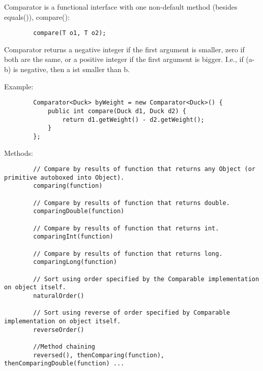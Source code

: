 \documentclass{scrartcl}
\begin{document}
    Comparator is a functional interface with one non-default method (besides equals()), compare():

    \begin{lstlisting}
        compare(T o1, T o2);
    \end{lstlisting}

    Comparator returns a negative integer if the first argument is smaller, zero if both are the same, or a positive integer if the first argument is bigger. I.e., if (a-b) is negative, then a ist smaller than b.

    Example:
    \begin{lstlisting}
        Comparator<Duck> byWeight = new Comparator<Duck>() {
            public int compare(Duck d1, Duck d2) {
                return d1.getWeight() - d2.getWeight();
            }
        };
    \end{lstlisting}

    Methods:

    \begin{lstlisting}
        // Compare by results of function that returns any Object (or primitive autoboxed into Object).
        comparing(function)

        // Compare by results of function that returns double.
        comparingDouble(function)

        // Compare by results of function that returns int.
        comparingInt(function)

        // Compare by results of function that returns long.
        comparingLong(function)

        // Sort using order specified by the Comparable implementation on object itself.
        naturalOrder()

        // Sort using reverse of order specified by Comparable implementation on object itself.
        reverseOrder()

        //Method chaining
        reversed(), thenComparing(function), thenComparingDouble(function) ...

    \end{lstlisting}

    \begin{lstlisting}
    \end{lstlisting}


    \begin{lstlisting}
    \end{lstlisting}


    \begin{lstlisting}
    \end{lstlisting}
\end{document}

